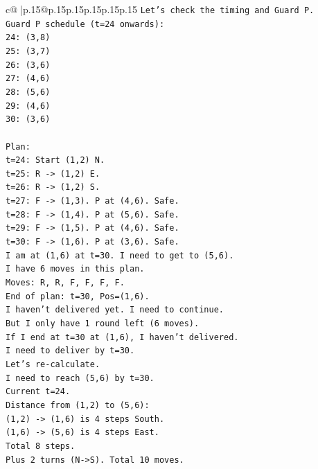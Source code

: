 \documentclass{article}
\begin{document}
{\begin{supertabular}{c@{$\;$}|p{.15\linewidth}@{}p{.15\linewidth}p{.15\linewidth}p{.15\linewidth}p{.15\linewidth}p{.15\linewidth}}
{{{\texttt{Let's check the timing and Guard P.} \\
\texttt{Guard P schedule (t=24 onwards):} \\
\texttt{24: (3,8)} \\
\texttt{25: (3,7)} \\
\texttt{26: (3,6)} \\
\texttt{27: (4,6)} \\
\texttt{28: (5,6)} \\
\texttt{29: (4,6)} \\
\texttt{30: (3,6)} \\
\\ 
\texttt{Plan:} \\
\texttt{t=24: Start (1,2) N.} \\
\texttt{t=25: R {-}> (1,2) E.} \\
\texttt{t=26: R {-}> (1,2) S.} \\
\texttt{t=27: F {-}> (1,3). P at (4,6). Safe.} \\
\texttt{t=28: F {-}> (1,4). P at (5,6). Safe.} \\
\texttt{t=29: F {-}> (1,5). P at (4,6). Safe.} \\
\texttt{t=30: F {-}> (1,6). P at (3,6). Safe.} \\
\texttt{I am at (1,6) at t=30. I need to get to (5,6).} \\
\texttt{I have 6 moves in this plan.} \\
\texttt{Moves: R, R, F, F, F, F.} \\
\texttt{End of plan: t=30, Pos=(1,6).} \\
\texttt{I haven't delivered yet. I need to continue.} \\
\texttt{But I only have 1 round left (6 moves).} \\
\texttt{If I end at t=30 at (1,6), I haven't delivered.} \\
\texttt{I need to deliver by t=30.} \\
\texttt{Let's re{-}calculate.} \\
\texttt{I need to reach (5,6) by t=30.} \\
\texttt{Current t=24.} \\
\texttt{Distance from (1,2) to (5,6):} \\
\texttt{(1,2) {-}> (1,6) is 4 steps South.} \\
\texttt{(1,6) {-}> (5,6) is 4 steps East.} \\
\texttt{Total 8 steps.} \\
\texttt{Plus 2 turns (N{-}>S). Total 10 moves.} \\
}}}
\end{supertabular}}
\end{document}
